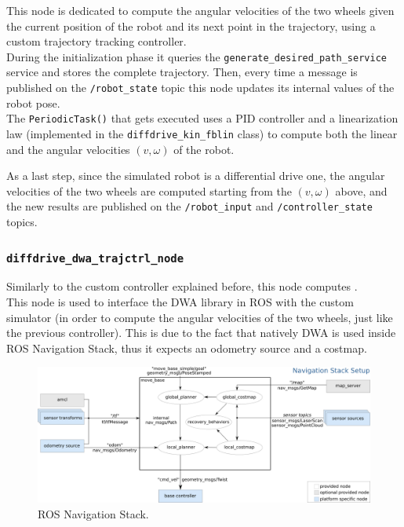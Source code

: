 \documentclass[11pt,a4paper]{article}
\begin{document}
This node is dedicated to compute the angular velocities of the two wheels given the current position
of the robot and its next point in the trajectory, using a custom trajectory tracking controller.\\

During the initialization phase it queries the \texttt{generate\_desired\_path\_service} service and
stores the complete trajectory.
Then, every time a message is published on the \texttt{/robot\_state} topic this node updates its
internal values of the robot pose.\\

The \texttt{PeriodicTask()} that gets executed uses a PID controller and a linearization law (implemented
in the \texttt{diffdrive\_kin\_fblin} class) to compute both the linear and the angular velocities
$(v, \omega)$ of the robot.

As a last step, since the simulated robot is a differential drive one, the angular velocities of
the two wheels are computed starting from the $(v, \omega)$ above, and the new results are published
on the \texttt{/robot\_input} and \texttt{/controller\_state} topics.

\subsubsection{\texttt{diffdrive\_dwa\_trajctrl\_node}}

Similarly to the custom controller explained before, this node computes .\\

This node is used to interface the DWA library in ROS with the custom simulator (in order to compute
the angular velocities of the two wheels, just like the previous controller).
This is due to the fact that natively DWA is used inside ROS Navigation Stack, thus it expects
an odometry source and a costmap.\\

\begin{figure}[H]
    \centering
    \includegraphics[scale=0.4]{other/navigation_stack.png}
    \caption{ROS Navigation Stack.}
\end{figure}
\end{document}
